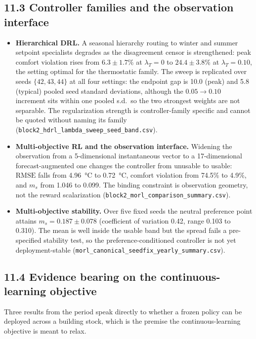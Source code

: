 \documentclass[11pt,a4paper]{article}
\newcommand{\ms}{\ensuremath{m_s}}
\newcommand{\RMSE}{\ensuremath{\mathrm{RMSE}}}
\begin{document}
\subsection*{11.3 Controller families and the observation interface}

\begin{itemize}[leftmargin=1.2em,itemsep=3pt]
\item \textbf{Hierarchical DRL.} A seasonal hierarchy routing to winter and summer setpoint
specialists degrades as the disagreement censor is strengthened: peak comfort violation rises
from $6.3 \pm 1.7$\% at $\lambda_T = 0$ to $24.4 \pm 3.8$\% at $\lambda_T = 0.10$, the setting
optimal for the thermostatic family. The sweep is replicated over seeds $\{42,43,44\}$ at all
four settings: the endpoint gap is 10.0 (peak) and 5.8 (typical) pooled seed standard
deviations, although the $0.05 \to 0.10$ increment sits within one pooled s.d.\ so the two
strongest weights are not separable. The regularization strength is controller-family specific
and cannot be quoted without naming its family
(\texttt{block2\_hdrl\_lambda\_sweep\_seed\_band.csv}).

\item \textbf{Multi-objective RL and the observation interface.} Widening the observation from a
5-dimensional instantaneous vector to a 17-dimensional forecast-augmented one changes the
controller from unusable to usable: \RMSE{} falls from \SI{4.96}{\celsius} to
\SI{0.72}{\celsius}, comfort violation from 74.5\% to 4.9\%, and \ms{} from 1.046 to 0.099. The
binding constraint is observation geometry, not the reward scalarization
(\texttt{block2\_morl\_comparison\_summary.csv}).

\item \textbf{Multi-objective stability.} Over five fixed seeds the neutral preference point
attains $\ms = 0.187 \pm 0.078$ (coefficient of variation 0.42, range 0.103 to 0.310). The mean
is well inside the usable band but the spread fails a pre-specified stability test, so the
preference-conditioned controller is not yet deployment-stable
(\texttt{morl\_canonical\_seedfix\_yearly\_summary.csv}).
\end{itemize}

\subsection*{11.4 Evidence bearing on the continuous-learning objective}

Three results from the period speak directly to whether a frozen policy can be deployed across a
building stock, which is the premise the continuous-learning objective is meant to relax.
\end{document}

